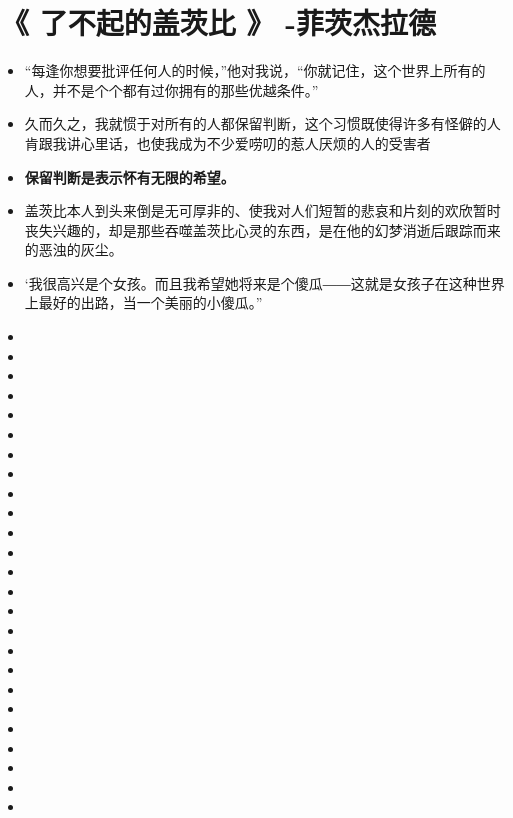 \documentclass[UTF8,a4paper,8pt]{ctexart}
\begin{document}
 \section{《 了不起的盖茨比 》 -菲茨杰拉德  }
 \begin{itemize}
 	\item “每逢你想要批评任何人的时候，”他对我说，“你就记住，这个世界上所有的人，并不是个个都有过你拥有的那些优越条件。”
 	\item 久而久之，我就惯于对所有的人都保留判断，这个习惯既使得许多有怪僻的人肯跟我讲心里话，也使我成为不少爱唠叨的惹人厌烦的人的受害者
 	\item \textbf{保留判断是表示怀有无限的希望。}
 	\item 盖茨比本人到头来倒是无可厚非的、使我对人们短暂的悲哀和片刻的欢欣暂时丧失兴趣的，却是那些吞噬盖茨比心灵的东西，是在他的幻梦消逝后跟踪而来的恶浊的灰尘。
 	\item ‘我很高兴是个女孩。而且我希望她将来是个傻瓜――这就是女孩子在这种世界上最好的出路，当一个美丽的小傻瓜。”
 	\item
 	\item 
 	\item 
 	\item 
 	\item 
 	\item 
 	\item 
 	\item 
 	\item 
 	\item 
 	\item 
 	\item 
 	\item 
 	\item 
 	\item 
 	\item 
 	\item 
 	\item 
 	\item 
 	\item 
 	\item 
 	\item 
 	\item 
 	\item 
 	\item  
 \end{itemize}
 
 \newpage 
\end{document}
